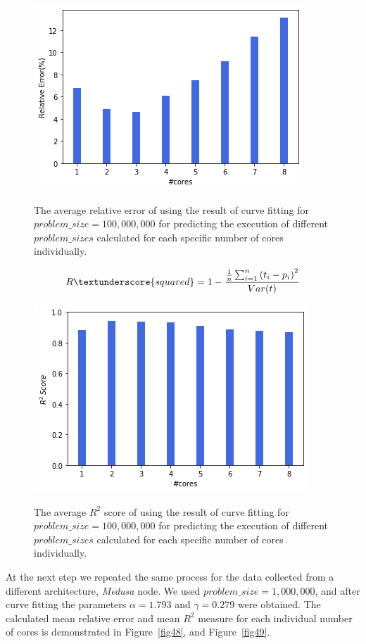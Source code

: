 \begin{figure}[H]
	\centering
	{\includegraphics[scale=.45]{images/hpx_for_loop/fitted/marvin_relative_error_all.png}}
	\caption{The average relative error of using the result of curve fitting for $problem\_size=100,000,000$ for predicting the execution of different $problem\_{sizes}$ calculated for each specific number of cores individually.}\label{fig45}		
\end{figure}

\begin{equation}{\label{eq5}}
R\textunderscore{squared} = 1-\frac{{\frac{1}{n}\sum_{i=1}^{n}{(t_i-p_i)}^2}}{Var(t)}
\end{equation}

\begin{figure}[H]
	\centering
	{\includegraphics[scale=.45]{images/hpx_for_loop/fitted/marvin_r2_error_all.png}}
	\caption{The average $R^2$ score of using the result of curve fitting for $problem\_size=100,000,000$ for predicting the execution of different $problem\_{sizes}$ calculated for each specific number of cores individually.}\label{fig46}		
\end{figure}

At the next step we repeated the same process for the data collected from a different architecture, \textit{Medusa} node.
We used $problem\_{size}=1,000,000$, and after curve fitting the parameters $\alpha=1.793$ and $\gamma=0.279$ were obtained. The calculated mean relative error and mean $R^2$ measure for each individual number of cores is demonstrated in Figure~\ref{fig48}, and Figure~\ref{fig49}.

